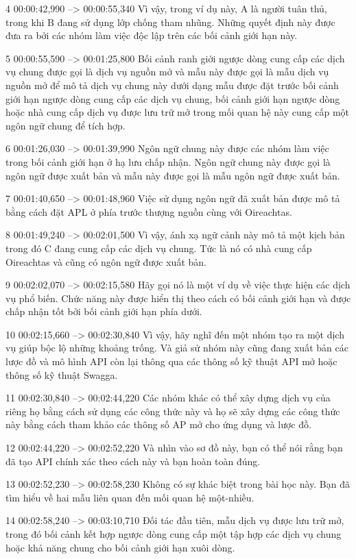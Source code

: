 4
00:00:42,990 --> 00:00:55,340
Vì vậy, trong ví dụ này, A là người tuân thủ, trong khi B đang sử dụng lớp chống tham nhũng.  Những quyết định này được đưa ra bởi các nhóm làm việc độc lập trên các bối cảnh giới hạn này.

5
00:00:55,590 --> 00:01:25,800
Bối cảnh ranh giới ngược dòng cung cấp các dịch vụ chung được gọi là dịch vụ nguồn mở và mẫu này được gọi là mẫu dịch vụ nguồn mở để mô tả dịch vụ chung này dưới dạng mẫu được đặt trước bối cảnh giới hạn ngược dòng cung cấp  các dịch vụ chung, bối cảnh giới hạn ngược dòng hoặc nhà cung cấp dịch vụ được lưu trữ mở trong mối quan hệ này cung cấp một ngôn ngữ chung để tích hợp.

6
00:01:26,030 --> 00:01:39,990
Ngôn ngữ chung này được các nhóm làm việc trong bối cảnh giới hạn ở hạ lưu chấp nhận.  Ngôn ngữ chung này được gọi là ngôn ngữ được xuất bản và mẫu này được gọi là mẫu ngôn ngữ được xuất bản.

7
00:01:40,650 --> 00:01:48,960
Việc sử dụng ngôn ngữ đã xuất bản được mô tả bằng cách đặt APL ở phía trước thượng nguồn cùng với Oireachtas.

8
00:01:49,240 --> 00:02:01,500
Vì vậy, ánh xạ ngữ cảnh này mô tả một kịch bản trong đó C đang cung cấp các dịch vụ chung.  Tức là nó có nhà cung cấp Oireachtas và cũng có ngôn ngữ được xuất bản.

9
00:02:02,070 --> 00:02:15,580
Hãy gọi nó là một ví dụ về việc thực hiện các dịch vụ phổ biến.  Chức năng này được hiển thị theo cách có bối cảnh giới hạn và được chấp nhận tốt bởi bối cảnh giới hạn phía dưới.

10
00:02:15,660 --> 00:02:30,840
Vì vậy, hãy nghĩ đến một nhóm tạo ra một dịch vụ giúp bộc lộ những khoảng trống.  Và giả sử nhóm này cũng đang xuất bản các lược đồ và mô hình API còn lại thông qua các thông số kỹ thuật API mở hoặc thông số kỹ thuật Swagga.

11
00:02:30,840 --> 00:02:44,220
Các nhóm khác có thể xây dựng dịch vụ của riêng họ bằng cách sử dụng các công thức này và họ sẽ xây dựng các công thức này bằng cách tham khảo các thông số AP mở cho ứng dụng và lược đồ.

12
00:02:44,220 --> 00:02:52,220
Và nhìn vào sơ đồ này, bạn có thể nói rằng bạn đã tạo API chính xác theo cách này và bạn hoàn toàn đúng.

13
00:02:52,230 --> 00:02:58,230
Không có sự khác biệt trong bài học này.  Bạn đã tìm hiểu về hai mẫu liên quan đến mối quan hệ một-nhiều.

14
00:02:58,240 --> 00:03:10,710
Đối tác đầu tiên, mẫu dịch vụ được lưu trữ mở, trong đó bối cảnh kết hợp ngược dòng cung cấp một tập hợp các dịch vụ chung hoặc khả năng chung cho bối cảnh giới hạn xuôi dòng.

